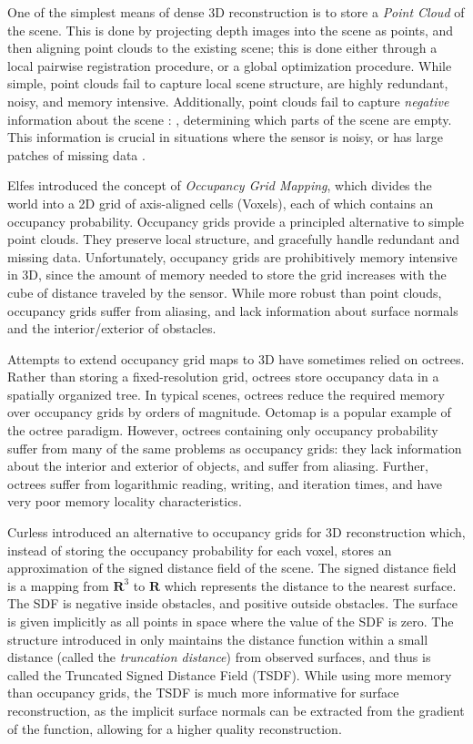 \documentclass[10pt,twocolumn,letterpaper]{article}
\begin{document}
One of the simplest means of dense 3D reconstruction is to  store a \emph{Point
Cloud} of the scene. This is done by projecting depth images into the scene as
points, and then aligning point clouds to the existing scene; this is done
either through a local pairwise registration procedure, or a global optimization
procedure. While simple, point clouds fail to capture local scene structure, are highly 
redundant, noisy, and memory intensive.  Additionally, point clouds fail to
capture \emph{negative} information about the scene :  \ie, determining
which parts of the scene are empty.  This information is crucial in situations
where the sensor is noisy, or has large patches of missing data \cite{Klingensmith2014}.

Elfes \cite{Elfes1989} introduced the concept of \emph{Occupancy Grid
Mapping}, which divides the world into a 2D grid of axis-aligned cells
(\ie Voxels), each of which contains an occupancy probability. Occupancy
grids provide a principled alternative to simple point clouds. They preserve local
structure, and gracefully handle redundant and missing data.
Unfortunately, occupancy grids are prohibitively memory intensive in 3D, since
the amount of memory needed to store the grid increases with the cube of distance 
traveled by the sensor. While more robust than point clouds, occupancy grids
suffer from aliasing, and lack information about surface normals and the
interior/exterior of obstacles.

Attempts to extend occupancy grid maps to 3D have sometimes relied on octrees.
Rather than storing a fixed-resolution grid, octrees store occupancy data in a
spatially organized tree. In typical scenes, octrees reduce the required memory
over occupancy grids by orders of magnitude. Octomap \cite{Wurm2010} is a
popular example of the octree paradigm. However, octrees containing only
occupancy probability suffer from many of the same problems as occupancy grids:
they lack information about the interior and exterior of objects, and suffer
from aliasing. Further, octrees suffer from logarithmic reading, writing, and
iteration times, and have very poor memory locality characteristics.

Curless \cite{Curless1996} introduced an alternative to occupancy grids for 3D
reconstruction which, instead of storing the occupancy probability for each
voxel, stores an approximation of the signed distance field of the scene. The signed distance
field is a mapping from $\mathbf{R}^3$ to $\mathbf{R}$ which represents the
distance to the nearest surface. The SDF is negative inside obstacles, and
positive outside obstacles. The surface is given implicitly as all points in
space where the value of the SDF is zero. The structure introduced in
\cite{Curless1996} only maintains the distance function within a small distance 
(called the \emph{truncation distance}) from observed surfaces, and thus is called the
Truncated Signed Distance Field (TSDF).  While using more memory than occupancy
grids, the TSDF is much more informative for surface reconstruction, as the
implicit surface normals can be extracted from the gradient of the function,
allowing for a higher quality reconstruction.
\end{document}
